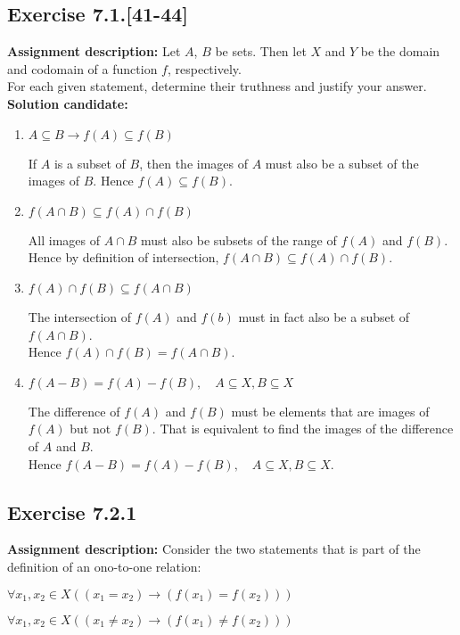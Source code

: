 \documentclass{report}
\newcommand{\cent}[1]{\begin{center}#1\end{center}}
\newcommand{\In}{\! \in \!}
\newcommand{\assignmentDescription}{\textbf{Assignment description: }}
\newcommand{\solution}{\textbf{Solution candidate: }}
\newcommand{\Exercise}[1]{\subsection{Exercise #1}}
\newcommand{\defaultEnumerateLabel}{\textbf{\alph*.}}
\begin{document}
 	\Exercise{7.1.[41-44]}
 	
 	\assignmentDescription
 	Let $A$, $B$ be sets. Then let $X$ and $Y$ be the domain and codomain of a function $f$, respectively.\\
 	
 	For each given statement, determine their truthness and justify your answer.\\
 	
 	\solution
 	\begin{enumerate}[label=\defaultEnumerateLabel]
 		\item $A\subseteq B \to f(A) \subseteq f(B)$
 		
 		If $A$ is a subset of $B$, then the images of $A$ must also be a subset of the images of $B$. Hence $f(A) \subseteq f(B)$.
 		
 		\item $f(A \cap B) \subseteq f(A) \cap f(B)$
 		
 		All images of $A \cap B$ must also be subsets of the range of $f(A)$ and $f(B)$.\\ 
 		
 		Hence by definition of intersection, $f(A \cap B) \subseteq f(A) \cap f(B)$.\\
 		\item $f(A) \cap f(B) \subseteq f(A \cap B)$
 		
 		The intersection of $f(A)$ and $f(b)$ must in fact also be a subset of $f(A \cap B)$.\\
 		
 		Hence $f(A) \cap f(B) = f(A \cap B)$.
 		
 		\item $ f(A-B) = f(A) - f(B), \quad A \subseteq X, B \subseteq X $
 		
 		The difference of $ f(A) $ and $f(B)$ must be elements that are images of $f(A)$ but not $f(B)$. That is equivalent to find the images of the difference of $A$ and $B$.\\ 
 		
 		Hence  $ f(A-B) = f(A) - f(B), \quad A \subseteq X, B \subseteq X $.
 	\end{enumerate}
 	
 	\Exercise{7.2.1}
 	
 	\assignmentDescription
 	Consider the two statements that is part of the definition of an ono-to-one relation:
 	
 	\cent{$\forall x_1, x_2 \In X ((x_1 = x_2) \to (f(x_1) = f(x_2) ))$}
 	\cent{$\forall x_1, x_2 \In X ((x_1 \neq x_2) \to (f(x_1) \neq f(x_2)))$}
 	
\end{document}
